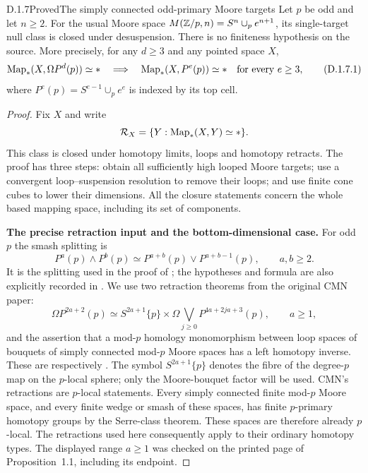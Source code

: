\begin{claim}{D.1.7}{Proved}{The simply connected odd-primary Moore targets}
Let $p$ be odd and let $n\geq2$. For the usual Moore space
$M(\mathbb Z/p,n)=S^n\cup_p e^{n+1}$, its single-target null class is
closed under desuspension. There is no finiteness hypothesis on the
source. More precisely, for any $d\geq3$ and any pointed space $X$,
\[
 \operatorname{Map}_*(X,\Omega P^d(p))\simeq *
 \quad\Longrightarrow\quad
 \operatorname{Map}_*(X,P^e(p))\simeq *\quad\hbox{for every }e\geq3,
 \tag{D.1.7.1}
\]
where $P^e(p)=S^{e-1}\cup_p e^e$ is indexed by its top cell.
\end{claim}
\begin{proof}
Fix $X$ and write
\[
 \mathcal R_X=\{Y:\operatorname{Map}_*(X,Y)\simeq *\}.
\]
This class is closed under homotopy limits, loops and homotopy
retracts. The proof has three steps: obtain all sufficiently high
looped Moore targets; use a convergent loop--suspension resolution
to remove their loops; and use finite cone cubes to lower their
dimensions. All the closure statements concern the whole based
mapping space, including its set of components.

\medskip\noindent
\textbf{The precise retraction input and the bottom-dimensional case.}
For odd $p$ the smash splitting is
\[
 P^a(p)\wedge P^b(p)
       \simeq P^{a+b}(p)\vee P^{a+b-1}(p),\qquad a,b\geq2.
 \tag{D.1.7.2}
\]
It is the splitting used in the proof of
\cite[Lemma~1.5, pp.~13--14]{I_CMN1987}; the hypotheses and formula
are also explicitly recorded in \cite[Lemma~4.5]{I_Boyde2021}.
We use two retraction theorems from the original CMN paper:
\[
 \Omega P^{2a+2}(p)
 \simeq S^{2a+1}\{p\}\times
       \Omega\bigvee_{j\geq0}P^{4a+2ja+3}(p),
       \qquad a\geq1,                              \tag{D.1.7.3}
\]
and the assertion that a mod-$p$ homology monomorphism between
loop spaces of bouquets of simply connected mod-$p$ Moore spaces
has a left homotopy inverse. These are respectively
\cite[Proposition~1.1, p.~9, and Proposition~1.7, p.~15]{I_CMN1987}.
The symbol $S^{2a+1}\{p\}$ denotes the fibre of the degree-$p$
map on the $p$-local sphere; only the Moore-bouquet factor will be
used. CMN's retractions are $p$-local statements. Every simply
connected finite mod-$p$ Moore space, and every finite wedge or
smash of these spaces, has finite $p$-primary homotopy groups by
the Serre-class theorem. These spaces are therefore already
$p$-local. The retractions used here consequently apply to their
ordinary homotopy types. The displayed range $a\geq1$ was checked
on the printed page of Proposition~1.1, including its endpoint.


\end{proof}
